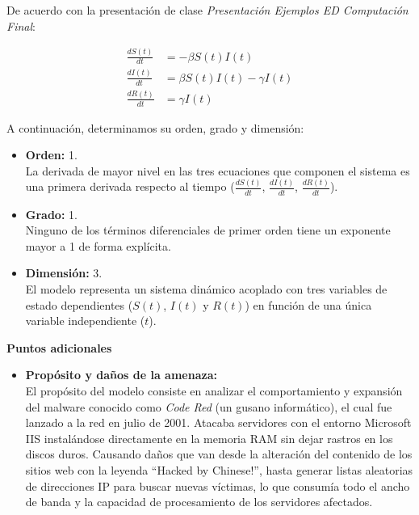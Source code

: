 \begin{enumerate}[label=\arabic*., leftmargin=*]
    De acuerdo con la presentación de clase \textit{Presentación Ejemplos ED Computación Final}:

    \begin{align*}
        \frac{dS(t)}{dt} &= -\beta S(t) I(t) \\
        \frac{dI(t)}{dt} &= \beta S(t) I(t) - \gamma I(t) \\
        \frac{dR(t)}{dt} &= \gamma I(t)
    \end{align*}

    A continuación, determinamos su orden, grado y dimensión:

    \begin{itemize}[leftmargin=*]
        \item \textbf{Orden:} 1.\\
        La derivada de mayor nivel en las tres ecuaciones que componen el sistema es una primera derivada respecto al tiempo ($\frac{dS(t)}{dt}$, $\frac{dI(t)}{dt}$, $\frac{dR(t)}{dt}$).

        \item \textbf{Grado:} 1.\\
        Ninguno de los términos diferenciales de primer orden tiene un exponente mayor a 1 de forma explícita.

        \item \textbf{Dimensión:} 3.\\
        El modelo representa un sistema dinámico acoplado con tres variables de estado dependientes ($S(t)$, $I(t)$ y $R(t)$) en función de una única variable independiente ($t$).
    \end{itemize}

    \vspace{0.3cm}
    \textbf{Puntos adicionales}

    \begin{itemize}[leftmargin=*]
        \item \textbf{Propósito y daños de la amenaza:}\\
        El propósito del modelo consiste en analizar el comportamiento y expansión del malware conocido como \textit{Code Red} (un gusano informático), el cual fue lanzado a la red en julio de 2001. Atacaba servidores con el entorno Microsoft IIS instalándose directamente en la memoria RAM sin dejar rastros en los discos duros. Causando daños que van desde la alteración del contenido de los sitios web con la leyenda ``Hacked by Chinese!'', hasta generar listas aleatorias de direcciones IP para buscar nuevas víctimas, lo que consumía todo el ancho de banda y la capacidad de procesamiento de los servidores afectados.


\end{itemize}
\end{enumerate}
